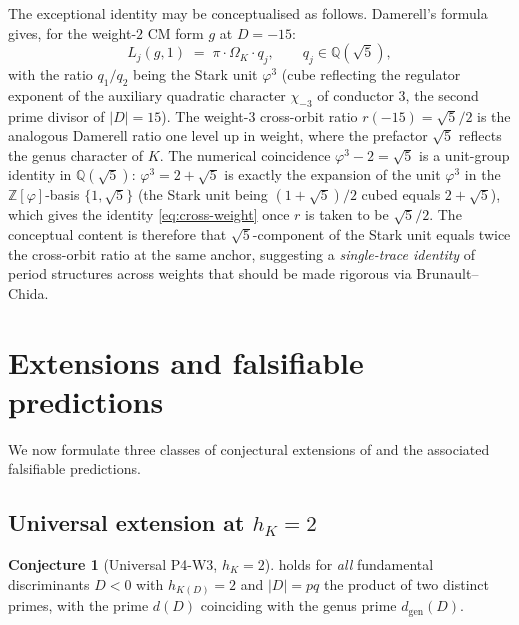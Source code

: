 \documentclass[11pt]{amsart}
\theoremstyle{definition}
\newtheorem{conjecture}[theorem]{Conjecture}
\theoremstyle{remark}
\newcommand{\Q}{\mathbb{Q}}
\newcommand{\Z}{\mathbb{Z}}
\begin{document}
The exceptional identity may be conceptualised as follows.
Damerell's formula gives, for the weight-\(2\) CM form \(g\) at
\(D = -15\):
\[
   L_{j}(g, 1)
   \;=\; \pi \cdot \Omega_{K} \cdot q_{j} ,
   \qquad q_{j} \in \Q(\sqrt{5}),
\]
with the ratio \(q_{1}/q_{2}\) being the Stark unit
\(\varphi^{3}\) (cube reflecting the regulator exponent of the
auxiliary quadratic character \(\chi_{-3}\) of conductor \(3\),
the second prime divisor of \(|D| = 15\)). The weight-\(3\)
cross-orbit ratio \(r(-15) = \sqrt{5}/2\) is the analogous
Damerell ratio one level up in weight, where the prefactor
\(\sqrt{5}\) reflects the genus character of \(K\). The numerical
coincidence \(\varphi^{3} - 2 = \sqrt{5}\) is a unit-group
identity in \(\Q(\sqrt{5})\): \(\varphi^{3} = 2 + \sqrt{5}\) is
exactly the expansion of the unit \(\varphi^{3}\) in the
\(\Z[\varphi]\)-basis \(\{1, \sqrt{5}\}\) (the Stark unit being
\((1 + \sqrt{5})/2\) cubed equals \(2 + \sqrt{5}\)), which gives
the identity \eqref{eq:cross-weight} once \(r\) is taken to be
\(\sqrt{5}/2\). The conceptual content is therefore that
\(\sqrt{5}\)-component of the Stark unit equals twice the
cross-orbit ratio at the same anchor, suggesting a
\emph{single-trace identity} of period structures across weights
that should be made rigorous via Brunault--Chida.


\section{Extensions and falsifiable predictions}\label{sec:extensions}

We now formulate three classes of conjectural extensions of
 and the associated falsifiable predictions.

\subsection{Universal extension at \(h_{K} = 2\)}\label{ssec:ext-univ}

\begin{conjecture}[Universal P4-W3, \(h_{K} = 2\)]\label{conj:univ}
 holds for \emph{all} fundamental discriminants
\(D < 0\) with \(h_{K(D)} = 2\) and \(|D| = pq\) the product of two
distinct primes, with the prime \(d(D)\) coinciding with the genus
prime \(d_{\mathrm{gen}}(D)\).
\end{conjecture}
\end{document}
